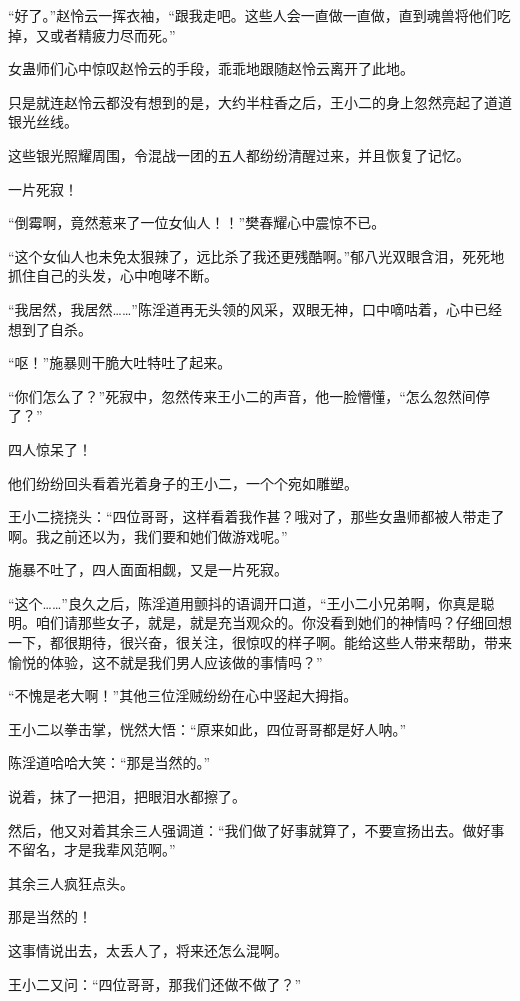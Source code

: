 \begin{this_body}
“好了。”赵怜云一挥衣袖，“跟我走吧。这些人会一直做一直做，直到魂兽将他们吃掉，又或者精疲力尽而死。”

女蛊师们心中惊叹赵怜云的手段，乖乖地跟随赵怜云离开了此地。

只是就连赵怜云都没有想到的是，大约半柱香之后，王小二的身上忽然亮起了道道银光丝线。

这些银光照耀周围，令混战一团的五人都纷纷清醒过来，并且恢复了记忆。

一片死寂！

“倒霉啊，竟然惹来了一位女仙人！！”樊春耀心中震惊不已。

“这个女仙人也未免太狠辣了，远比杀了我还更残酷啊。”郁八光双眼含泪，死死地抓住自己的头发，心中咆哮不断。

“我居然，我居然……”陈淫道再无头领的风采，双眼无神，口中嘀咕着，心中已经想到了自杀。

“呕！”施暴则干脆大吐特吐了起来。

“你们怎么了？”死寂中，忽然传来王小二的声音，他一脸懵懂，“怎么忽然间停了？”

四人惊呆了！

他们纷纷回头看着光着身子的王小二，一个个宛如雕塑。

王小二挠挠头：“四位哥哥，这样看着我作甚？哦对了，那些女蛊师都被人带走了啊。我之前还以为，我们要和她们做游戏呢。”

施暴不吐了，四人面面相觑，又是一片死寂。

“这个……”良久之后，陈淫道用颤抖的语调开口道，“王小二小兄弟啊，你真是聪明。咱们请那些女子，就是，就是充当观众的。你没看到她们的神情吗？仔细回想一下，都很期待，很兴奋，很关注，很惊叹的样子啊。能给这些人带来帮助，带来愉悦的体验，这不就是我们男人应该做的事情吗？”

“不愧是老大啊！”其他三位淫贼纷纷在心中竖起大拇指。

王小二以拳击掌，恍然大悟：“原来如此，四位哥哥都是好人呐。”

陈淫道哈哈大笑：“那是当然的。”

说着，抹了一把泪，把眼泪水都擦了。

然后，他又对着其余三人强调道：“我们做了好事就算了，不要宣扬出去。做好事不留名，才是我辈风范啊。”

其余三人疯狂点头。

那是当然的！

这事情说出去，太丢人了，将来还怎么混啊。

王小二又问：“四位哥哥，那我们还做不做了？”


\end{this_body}
